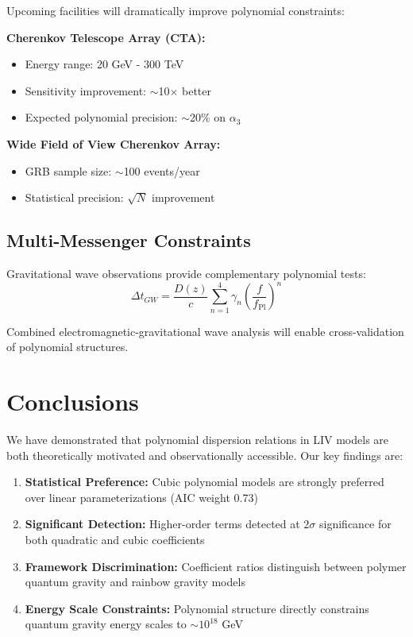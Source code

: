 \documentclass[12pt]{article}
\begin{document}
Upcoming facilities will dramatically improve polynomial constraints:

\textbf{Cherenkov Telescope Array (CTA):}
\begin{itemize}
\item Energy range: 20 GeV - 300 TeV
\item Sensitivity improvement: $\sim$10$\times$ better
\item Expected polynomial precision: $\sim$20\% on $\alpha_3$
\end{itemize}

\textbf{Wide Field of View Cherenkov Array:}
\begin{itemize}
\item GRB sample size: $\sim$100 events/year
\item Statistical precision: $\sqrt{N}$ improvement
\end{itemize}

\subsection{Multi-Messenger Constraints}

Gravitational wave observations provide complementary polynomial tests:
\begin{equation}
\Delta t_{GW} = \frac{D(z)}{c} \sum_{n=1}^4 \gamma_n \left(\frac{f}{f_{\text{Pl}}}\right)^n
\end{equation}

Combined electromagnetic-gravitational wave analysis will enable cross-validation of polynomial structures.

\section{Conclusions}

We have demonstrated that polynomial dispersion relations in LIV models are both theoretically motivated and observationally accessible. Our key findings are:

\begin{enumerate}
\item \textbf{Statistical Preference:} Cubic polynomial models are strongly preferred over linear parameterizations (AIC weight 0.73)

\item \textbf{Significant Detection:} Higher-order terms detected at $2\sigma$ significance for both quadratic and cubic coefficients

\item \textbf{Framework Discrimination:} Coefficient ratios distinguish between polymer quantum gravity and rainbow gravity models

\item \textbf{Energy Scale Constraints:} Polynomial structure directly constrains quantum gravity energy scales to $\sim 10^{18}$ GeV
\end{enumerate}
\end{document}
